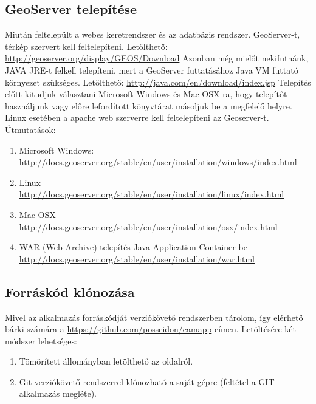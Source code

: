\subsection{GeoServer telepítése} %
\label{sub:geoserver_telepítése}
Miután feltelepült a webes keretrendszer és az adatbázis rendszer. GeoServer-t, térkép szervert kell feltelepíteni.
Letölthető: \url{http://geoserver.org/display/GEOS/Download}
Azonban még mielőt nekifutnánk, JAVA JRE-t felkell telepíteni, mert a GeoServer futtatásához Java VM futtató környezet szükséges.
Letölthető: \url{http://java.com/en/download/index.jsp}
Telepítés előtt kitudjuk választani Microsoft Windows és Mac OSX-ra, hogy telepítőt használjunk vagy előre lefordított könyvtárat másoljuk be a megfelelő helyre. Linux esetében a apache web szerverre kell feltelepíteni az Geoserver-t.
Útmutatások:
\begin{enumerate}
  \item Microsoft Windows:\\
  \url{http://docs.geoserver.org/stable/en/user/installation/windows/index.html}
  \item Linux \\
  \url{http://docs.geoserver.org/stable/en/user/installation/linux/index.html}
  \item Mac OSX \\
  \url{http://docs.geoserver.org/stable/en/user/installation/osx/index.html}
  \item WAR (Web Archive) telepítés Java Application Container-be \\
  \url{http://docs.geoserver.org/stable/en/user/installation/war.html}
\end{enumerate}

\subsection{Forráskód klónozása} %
\label{sub:forráskód_klónozása}
Mivel az alkalmazás forráskódját verziókövető rendszerben tárolom, így elérhető bárki számára a \url{https://github.com/posseidon/camapp} címen.
Letöltésére két módszer lehetséges:
\begin{enumerate}
  \item Tömörített állományban letölthető az oldalról.
  \item Git verziókövető rendszerrel klónozható a saját gépre (feltétel a GIT alkalmazás megléte).
\end{enumerate}

